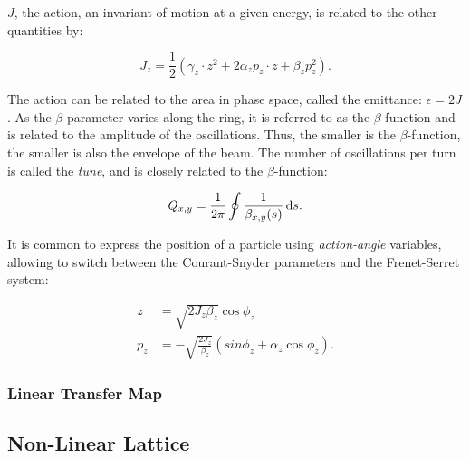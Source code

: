 $J$, the action, an invariant of motion at a given energy, is related to the other quantities by:

\begin{equation}
    J_z = \frac{1}{2} (\gamma_z \cdot z^2 + 2 \alpha_z p_z \cdot z + \beta_z p_z^2).
    \label{eq:coordinate_systems:action}
\end{equation}

The action can be related to the area in phase space, called the emittance: $\epsilon = 2J$.
As the $\beta$ parameter varies along the ring, it is referred to as the $\beta$-function and is
related to the amplitude of the oscillations. Thus, the smaller is the $\beta$-function, the
smaller is also the envelope of the beam.
The number of oscillations per turn is called the \textit{tune}, and is closely related to the
$\beta$-function:

\begin{equation}
    Q_{x,y} = \frac{1}{2 \pi} \oint \frac{1}{\beta_{x,y}(s)} \mathop{}\!\mathrm{d} s.
    \label{eq:coordinate_systems:tune}
\end{equation}


It is common to express the position of a particle using \textit{action-angle} variables, allowing
to switch between the Courant-Snyder parameters and the Frenet-Serret system:

\begin{equation}
    \begin{aligned}
    z   &= \sqrt{2J_z \beta_z} \cos{\phi_z} \\
    p_z &= - \sqrt{\frac{2J_z}{\beta_z}} \left( sin{\phi_z} + \alpha_z \cos{\phi_z}\right).
    \end{aligned}
    \label{eq:coordinate_systems:action_angle}
\end{equation}


\subsubsection{Linear Transfer Map}




\subsection{Non-Linear Lattice}

